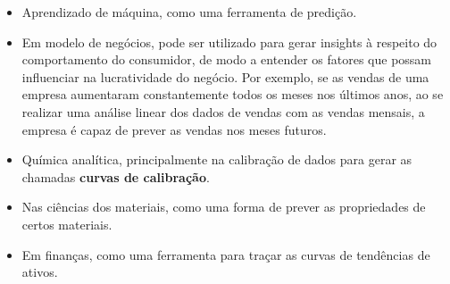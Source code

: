 \begin{itemize}
\item Aprendizado de máquina, como uma ferramenta de predição.
\item Em modelo de negócios, pode ser utilizado para gerar insights à respeito do comportamento do consumidor, de modo a entender os fatores que possam influenciar na lucratividade do negócio. Por exemplo, se as vendas de uma empresa aumentaram constantemente todos os meses nos últimos anos, ao se realizar uma análise linear dos dados de vendas com as vendas mensais, a empresa é capaz de prever as vendas nos meses futuros. 
\item Química analítica, principalmente na calibração de dados para gerar as chamadas \textbf{curvas de calibração}.
\item Nas ciências dos materiais, como uma forma de prever as propriedades de certos materiais.
\item Em finanças, como uma ferramenta para traçar as curvas de tendências de ativos.

\end{itemize} 





